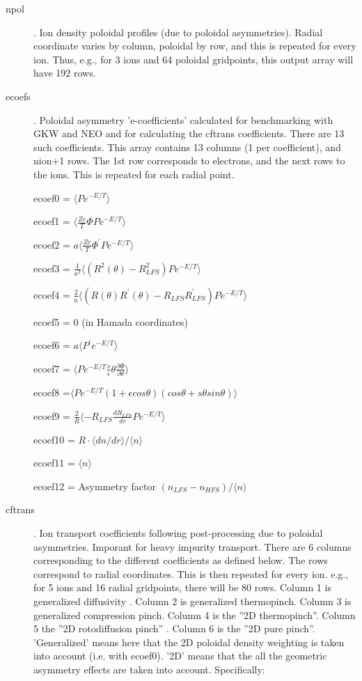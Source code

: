 \documentclass{article}
\begin{document}
\begin{description} 

\item[npol]. Ion density poloidal profiles (due to poloidal asymmetries). Radial coordinate varies by column, poloidal by row, and this is repeated for every ion. Thus, e.g., for 3 ions and 64 poloidal gridpoints, this output array will have 192 rows.
\item[ecoefs]. Poloidal asymmetry 'e-coefficients' calculated for benchmarking with GKW and NEO and for calculating the cftrans 
coefficients. There are 13 such coefficients. This array contains 13 columns (1 per coefficient), and nion+1 rows. 
The 1st row corresponds to electrons, and the next rows to the ions. This is repeated for each radial point. 

ecoef0 = ${\langle}Pe^{-E/T}{\rangle}$

ecoef1 = ${\langle}\frac{Ze}{T}{\Phi}Pe^{-E/T}{\rangle}$

ecoef2 = $a{\langle}\frac{Ze}{T}{\Phi^\prime}Pe^{-E/T}{\rangle}$

ecoef3 = $\frac{1}{a^2}{\langle}(R^2(\theta)-R^2_{LFS})Pe^{-E/T}{\rangle}$

ecoef4 = $\frac{2}{a}{\langle}(R(\theta)R^\prime(\theta)-R_{LFS}R^\prime_{LFS})Pe^{-E/T}{\rangle}$

ecoef5 = 0 (in Hamada coordinates)

ecoef6 = $a{\langle}P^{\prime}e^{-E/T}{\rangle}$

ecoef7 = ${\langle}Pe^{-E/T}\frac{s}{\epsilon}\theta\frac{\partial\Phi}{{\partial}\theta}{\rangle}$

ecoef8 =${\langle}Pe^{-E/T}(1+{\epsilon}cos\theta)(cos\theta+s{\theta}sin\theta){\rangle}$

ecoef9 = $\frac{2}{R}{\langle}-R_{LFS}\frac{dR_{LFS}}{dr}Pe^{-E/T}{\rangle}$

ecoef10 = $R{\cdot}{\langle}dn/dr{\rangle}/{\langle}n{\rangle}$

ecoef11 = ${\langle}n{\rangle}$

ecoef12 = Asymmetry factor $(n_{LFS}-n_{HFS})/{\langle}n{\rangle}$

\item[cftrans]. Ion transport coefficients following post-processing due to poloidal asymmetries. Imporant for heavy impurity transport.
 There are 6 columns corresponding to the different coefficients as defined below. The rows correspond to radial coordinates. 
This is then repeated for every ion. e.g., for 5 ions and 16 radial gridpoints, there will be 80 rows. Column 1 is generalized 
diffusivity . Column 2 is generalized thermopinch. Column 3 is generalized compression pinch. Column 4 is the ''2D thermopinch''. 
Column 5 the ''2D rotodiffusion pinch'' . Column 6 is the ''2D pure pinch''. 'Generalized' means here that the 2D poloidal density 
weighting is taken into account (i.e. with ecoef0). '2D' means that the all the geometric asymmetry effects are taken into account. Specifically: 


\end{description}
\end{document}
